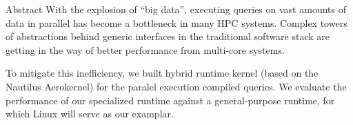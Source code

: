 \begin{block}{Abstract}
  With the explosion of ``big data'', executing queries on vast amounts of data in parallel has become a bottleneck in many HPC systems.
  Complex towers of abstractions behind generic interfaces in the traditional software stack are getting in the way of better performance from multi-core systems.

  To mitigate this inefficiency, we built hybrid runtime kernel (based on the Nautilus Aerokernel) for the paralel execution compiled queries.
  We evaluate the performance of our specialized runtime against a general-purpose runtime, for which Linux will serve as our examplar.
\end{block}

